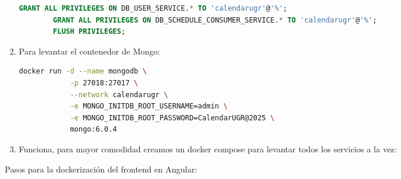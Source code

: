 \begin{enumerate}
\begin{lstlisting}[language=sql]
        GRANT ALL PRIVILEGES ON DB_USER_SERVICE.* TO 'calendarugr'@'%';
        GRANT ALL PRIVILEGES ON DB_SCHEDULE_CONSUMER_SERVICE.* TO 'calendarugr'@'%';
        FLUSH PRIVILEGES;
    \end{lstlisting}
    \item Para levantar el contenedor de Mongo:
    \begin{lstlisting}[language=bash]
        docker run -d --name mongodb \
            -p 27018:27017 \
            --network calendarugr \
            -e MONGO_INITDB_ROOT_USERNAME=admin \
            -e MONGO_INITDB_ROOT_PASSWORD=CalendarUGR@2025 \
            mongo:6.0.4
    \end{lstlisting}
    \item Funciona, para mayor comodidad creamos un docker compose para levantar todos los servicios a la vez:

\end{enumerate}

Pasos para la dockerización del frontend en Angular:

